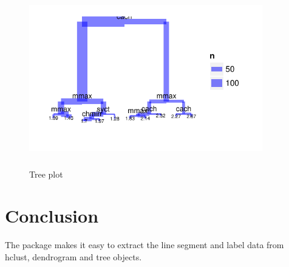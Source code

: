 \documentclass[10pt,oneside]{article}
\begin{document}
\begin{figure}[h]
\begin{center}
\includegraphics[width=4in, height=3in]{ggdendro-tree1}
\end{center}
\caption{Tree plot}
\end{figure}


\section{Conclusion}

The \ggdendro{} package makes it easy to extract the line segment and label data from hclust, dendrogram and tree objects.


\end{document}
